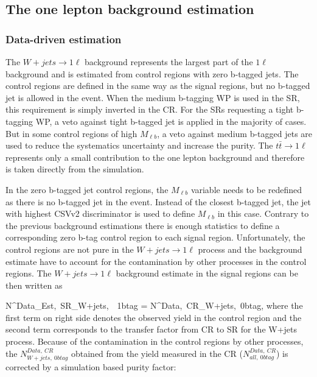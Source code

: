 \subsection{The one lepton background estimation}

\subsubsection{Data-driven estimation}

The $W+jets \to 1\ell$ background  represents the largest part of the $1\ell$ background and is estimated from control regions with zero b-tagged jets. The control regions are defined in the same way as the signal regions, but no b-tagged jet is allowed in the event. When the medium b-tagging WP is used in the SR, this requirement is simply inverted in the CR. For the SRs requesting a tight b-tagging WP, a veto against tight b-tagged jet is applied in the majority of cases.  But in some control regions of high $M_{\ell b}$, a veto against medium b-tagged jets are used to reduce the systematics uncertainty and increase the purity. The  $t\bar{t} \to 1\ell$ represents only a small contribution to the one lepton background and therefore is taken directly from the simulation.

In the zero b-tagged jet control regions, the $M_{\ell b}$ variable needs to be redefined as there is no b-tagged jet in the event. Instead of the closest b-tagged jet, the jet with highest CSVv2 discriminator is used to define $M_{\ell b}$ in this case. Contrary to the previous background estimations there is enough statistics to define a corresponding zero b-tag control region to each signal region. Unfortunately, the control regions are not pure in the $W+jets \to 1\ell$  process and the background estimate have to account for the contamination by other  processes in the control regions. The $W+jets \to 1\ell$  background estimate in the signal regions can be then written as

{
N^{Data_{Est},~SR}_{W+jets,~\geq~1btag}  =  N^{Data,~CR}_{W+jets,~0btag}\times  {},
}
where the first term on right side denotes the observed yield in the control region and the second term corresponds to the transfer factor from CR to SR for the W+jets process. Because of the contamination in the control regions by other processes, the $N^{Data,~CR}_{W+jets,~0btag}$ obtained from the yield measured in the CR ($N^{Data,~CR}_{all,~0btag}$) is corrected by a simulation based purity factor: 


